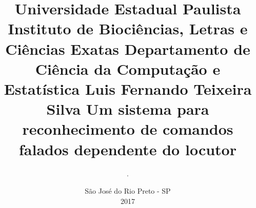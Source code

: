 \documentclass[a4paper,12pt,twoside,openright]{report}
\begin{document}
\titlespacing{\section}{0cm}{1.5cm}{1.5cm}
\titlespacing{\subsection}{0cm}{1.5cm}{1.5cm}
\title{
	\vspace*{-120pt}
	\hspace*{+55pt}Universidade Estadual Paulista
	\newline
	\hspace*{+45pt}Instituto de Bioci\^{e}ncias, Letras e Ci\^{e}ncias Exatas
	\newline
	\hspace*{+50pt}Departamento de Ci\^{e}ncia da Computa\c{c}\~{a}o e Estat\'{i}stica
	\newline
	\newline
	\newline
	\hspace*{+50pt}Luis Fernando Teixeira Silva
	\newline
	\newline
	\newline
	Um sistema para reconhecimento de comandos falados dependente do locutor
}
\author{{\tiny .}}
\date{\vspace*{+60pt}S\~{a}o Jos\'{e} do Rio Preto - SP \\ 2017}
\maketitle
\newpage
\thispagestyle{empty}
\pagestyle{empty}
\end{document}
